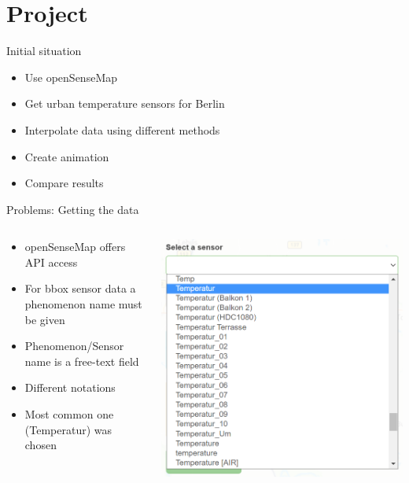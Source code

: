 
\section{Project}
\begin{frame}{Initial situation}
	\begin{itemize}
		\item<1-> Use openSenseMap
		\item<2-> Get urban temperature sensors for Berlin
		\item<3-> Interpolate data using different methods 
		\item<4-> Create animation
		\item<5-> Compare results
	\end{itemize}
\end{frame}
\begin{frame}{Problems: Getting the data}
\begin{columns}[c] %
	\begin{column}{.52\textwidth}
		\begin{itemize}
			\item openSenseMap offers API access
			\item For bbox sensor data a phenomenon name must be given
			\item Phenomenon/Sensor name is a free-text field
			\item Different notations
			\item<2-> Most common one (Temperatur) was chosen
		\end{itemize}
	\end{column}%
	\hfill%
	\begin{column}{.48\textwidth}
		\includegraphics[width=\linewidth]{../writeup/images/phenomenon_name.png}
	\end{column}%
\end{columns}
\end{frame}
